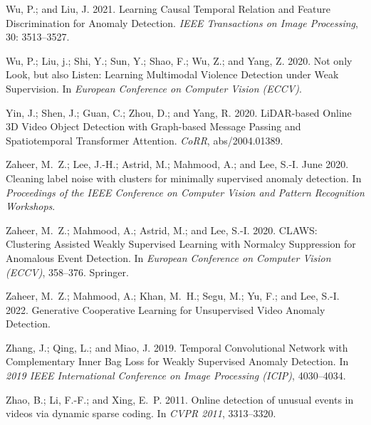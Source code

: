 \documentclass[letterpaper]{article} \usepackage{aaai23}  \usepackage{times}  \usepackage{helvet}  \usepackage{courier}  \usepackage[hyphens]{url}  \usepackage{graphicx} \urlstyle{rm} \def\UrlFont{\rm}  \usepackage{natbib}  \usepackage{caption} \frenchspacing  \setlength{\pdfpagewidth}{8.5in}  \setlength{\pdfpageheight}{11in}  \usepackage{algorithm}
\begin{document}
\begin{thebibliography}{50}
Wu, P.; and Liu, J. 2021.
\newblock Learning Causal Temporal Relation and Feature Discrimination for
  Anomaly Detection.
\newblock \emph{IEEE Transactions on Image Processing}, 30: 3513--3527.

Wu, P.; Liu, j.; Shi, Y.; Sun, Y.; Shao, F.; Wu, Z.; and Yang, Z. 2020.
\newblock Not only Look, but also Listen: Learning Multimodal Violence
  Detection under Weak Supervision.
\newblock In \emph{European Conference on Computer Vision (ECCV)}.

Yin, J.; Shen, J.; Guan, C.; Zhou, D.; and Yang, R. 2020.
\newblock LiDAR-based Online 3D Video Object Detection with Graph-based Message
  Passing and Spatiotemporal Transformer Attention.
\newblock \emph{CoRR}, abs/2004.01389.

Zaheer, M.~Z.; Lee, J.-H.; Astrid, M.; Mahmood, A.; and Lee, S.-I. June 2020.
\newblock Cleaning label noise with clusters for minimally supervised anomaly
  detection.
\newblock In \emph{Proceedings of the IEEE Conference on Computer Vision and
  Pattern Recognition Workshops}.

Zaheer, M.~Z.; Mahmood, A.; Astrid, M.; and Lee, S.-I. 2020.
\newblock CLAWS: Clustering Assisted Weakly Supervised Learning with Normalcy
  Suppression for Anomalous Event Detection.
\newblock In \emph{European Conference on Computer Vision (ECCV)}, 358--376.
  Springer.

Zaheer, M.~Z.; Mahmood, A.; Khan, M.~H.; Segu, M.; Yu, F.; and Lee, S.-I. 2022.
\newblock Generative Cooperative Learning for Unsupervised Video Anomaly
  Detection.

Zhang, J.; Qing, L.; and Miao, J. 2019.
\newblock Temporal Convolutional Network with Complementary Inner Bag Loss for
  Weakly Supervised Anomaly Detection.
\newblock In \emph{2019 IEEE International Conference on Image Processing
  (ICIP)}, 4030--4034.

Zhao, B.; Li, F.-F.; and Xing, E.~P. 2011.
\newblock Online detection of unusual events in videos via dynamic sparse
  coding.
\newblock In \emph{CVPR 2011}, 3313--3320.


\end{thebibliography}
\end{document}
